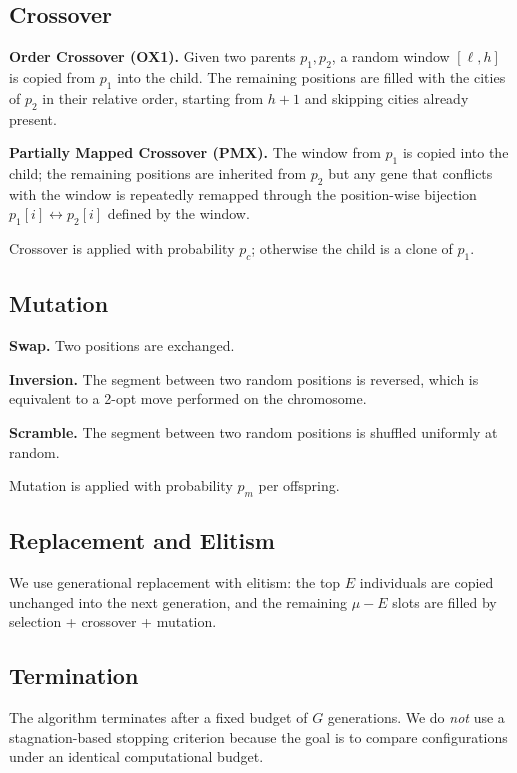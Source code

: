 \documentclass[conference]{IEEEtran}
\begin{document}
\subsection{Crossover}

\textbf{Order Crossover (OX1).} Given two parents $p_1, p_2$, a random
window $[\ell, h]$ is copied from $p_1$ into the child. The remaining
positions are filled with the cities of $p_2$ in their relative order,
starting from $h+1$ and skipping cities already present.

\textbf{Partially Mapped Crossover (PMX).} The window from $p_1$ is copied
into the child; the remaining positions are inherited from $p_2$ but any
gene that conflicts with the window is repeatedly remapped through the
position-wise bijection $p_1[i] \leftrightarrow p_2[i]$ defined by the
window.

Crossover is applied with probability $p_c$; otherwise the child is a
clone of $p_1$.

\subsection{Mutation}

\textbf{Swap.} Two positions are exchanged.\par
\textbf{Inversion.} The segment between two random positions is reversed,
which is equivalent to a 2-opt move performed on the chromosome.\par
\textbf{Scramble.} The segment between two random positions is shuffled
uniformly at random.

Mutation is applied with probability $p_m$ per offspring.

\subsection{Replacement and Elitism}

We use generational replacement with elitism: the top $E$ individuals are
copied unchanged into the next generation, and the remaining $\mu - E$
slots are filled by selection + crossover + mutation.

\subsection{Termination}

The algorithm terminates after a fixed budget of $G$ generations. We do
\emph{not} use a stagnation-based stopping criterion because the goal is to
compare configurations under an identical computational budget.
\end{document}
